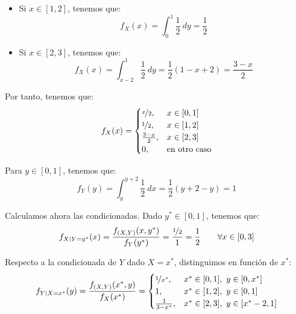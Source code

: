 \begin{ejercicio}
\begin{itemize}
        \item Si $x\in [1,2]$, tenemos que:
        \begin{equation*}
            f_X(x) = \int_{0}^{1} \dfrac{1}{2} \ dy = \dfrac{1}{2}
        \end{equation*}

        \item Si $x\in [2,3]$, tenemos que:
        \begin{equation*}
            f_X(x) = \int_{x-2}^{1} \dfrac{1}{2} \ dy = \dfrac{1}{2}(1-x+2)
            = \frac{3-x}{2}
        \end{equation*}
    \end{itemize}
    Por tanto, tenemos que:
    \begin{equation*}
        f_X(x) = \begin{cases}
            \nicefrac{x}{2}, & x\in [0,1]\\
            \nicefrac{1}{2}, & x\in [1,2]\\
            \frac{3-x}{2}, & x\in [2,3]\\
            0, & \text{en otro caso}
        \end{cases}
    \end{equation*}

    Para $y\in [0,1]$, tenemos que:
    \begin{equation*}
        f_Y(y) = \int_{y}^{y+2} \dfrac{1}{2} \ dx = \dfrac{1}{2}(y+2-y) = 1
    \end{equation*}

    Calculamos ahora las condicionadas. Dado $y^*\in [0,1]$, tenemos que:
    \begin{equation*}
        f_{X\mid Y=y^*}(x) = \dfrac{f_{(X,Y)}(x, y^*)}{f_Y(y^*)} = \dfrac{\nicefrac{1}{2}}{1} = \dfrac{1}{2} \qquad \forall x\in [0,3]
    \end{equation*}

    Respecto a la condicionada de $Y$ dado $X=x^*$, distinguimos en función de $x^*$:
    \begin{equation*}
        f_{Y\mid X=x^*}(y) = \dfrac{f_{(X,Y)}(x^*, y)}{f_X(x^*)} = \begin{cases}
            \nicefrac{1}{x^*}, & x^*\in [0,1],~y\in [0,x^*]\\
            1, & x^*\in [1,2],~y\in [0,1]\\
            \frac{1}{3-x^*}, & x^*\in [2,3],~y\in [x^*-2,1]
        \end{cases}
    \end{equation*}


\end{ejercicio}
